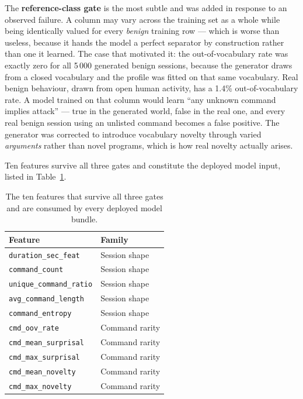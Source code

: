\documentclass{classeENS}
\begin{document}
The \textbf{reference-class gate} is the most subtle and was added in response to an observed failure. A column may vary across the training set as a whole while being identically valued for every \emph{benign} training row --- which is worse than useless, because it hands the model a perfect separator by construction rather than one it learned. The case that motivated it: the out-of-vocabulary rate was exactly zero for all 5\,000 generated benign sessions, because the generator draws from a closed vocabulary and the profile was fitted on that same vocabulary. Real benign behaviour, drawn from open human activity, has a 1.4\% out-of-vocabulary rate. A model trained on that column would learn ``any unknown command implies attack'' --- true in the generated world, false in the real one, and every real benign session using an unlisted command becomes a false positive. The generator was corrected to introduce vocabulary novelty through varied \emph{arguments} rather than novel programs, which is how real novelty actually arises.

Ten features survive all three gates and constitute the deployed model input, listed in Table~\ref{tab:features}.

\begin{table}[H]
\centering
\begin{tabular}{|l|l|}
\hline
\textbf{Feature} & \textbf{Family} \\
\hline
\texttt{duration\_sec\_feat} & Session shape \\
\texttt{command\_count} & Session shape \\
\texttt{unique\_command\_ratio} & Session shape \\
\texttt{avg\_command\_length} & Session shape \\
\texttt{command\_entropy} & Session shape \\
\texttt{cmd\_oov\_rate} & Command rarity \\
\texttt{cmd\_mean\_surprisal} & Command rarity \\
\texttt{cmd\_max\_surprisal} & Command rarity \\
\texttt{cmd\_mean\_novelty} & Command rarity \\
\texttt{cmd\_max\_novelty} & Command rarity \\
\hline
\end{tabular}
\caption{The ten features that survive all three gates and are consumed by every deployed model bundle.}
\label{tab:features}
\end{table}
\end{document}
